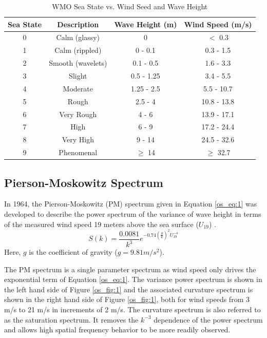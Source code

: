 \begin{table}[H]
  \begin{center}
      \renewcommand{\baselinestretch}{1} \small\normalsize
  \begin{quote}
    \caption[WMO Sea State vs. Wind Speed and Wave Height]{WMO Sea State vs. Wind Seed and Wave Height\label{os_tab:0}}
  \end{quote}
  \begin{tabular} {|c | c | c| c|}
    \hline
  \bf{Sea State} & \bf{Descriptio}n & \bf{Wave Height (m)} & \bf{Wind Speed (m/s)}\\ \hline
  0 & Calm (glassy) & 0 & $<$ 0.3 \\ \hline
  1 & Calm (rippled) & 0 - 0.1 & 0.3 - 1.5 \\ \hline
  2 & Smooth (wavelets) & 0.1 - 0.5 & 1.6 - 3.3 \\ \hline
  3 & Slight & 0.5 - 1.25 & 3.4 - 5.5 \\ \hline
  4 & Moderate & 1.25 - 2.5 & 5.5 - 10.7 \\ \hline
  5 & Rough & 2.5 - 4 & 10.8 - 13.8 \\ \hline
  6 & Very Rough & 4 - 6 & 13.9 - 17.1\\ \hline
  7 & High & 6 - 9 & 17.2 - 24.4\\ \hline
  8 & Very High & 9 - 14 & 24.5 - 32.6\\ \hline
  9 & Phenomenal & $\geq$ 14 & $\geq$ 32.7\\ \hline
\end{tabular}
\end{center}
\end{table}
\renewcommand{\baselinestretch}{2} \small\normalsize

\subsection{Pierson-Moskowitz Spectrum}
In 1964, the Pierson-Moskowitz (PM) spectrum given in Equation \ref{os_eq:1} was developed to describe the power spectrum of the variance of wave height in terms of the measured wind speed 19 meters above the sea surface ($U_{19}$) \cite{michel_sea_spectra}. 
 \begin{equation}
S(k) = \frac{0.0081}{k^3}e^{-0.74\left(\frac{g}{k}\right)^2U_{19}^{-4}}
\label{os_eq:1}
\end{equation}
 \renewcommand{\baselinestretch}{2} \small\normalsize
Here, $g$ is the coefficient of gravity ($g = 9.81 m/s^2$). 
 
The PM spectrum is a single parameter spectrum as wind speed only drives the exponential term of Equation \ref{os_eq:1}. The variance power spectrum is shown in the left hand side of Figure \ref{os_fig:1} and the associated curvature spectrum is shown in the right hand side of Figure \ref{os_fig:1}, both for wind speeds from 3 m/s to 21 m/s in increments of 2 m/s. The curvature spectrum is also referred to as the saturation spectrum. It removes the $k^{-3}$ dependence of the power spectrum and allows high spatial frequency behavior to be more readily observed.
 
